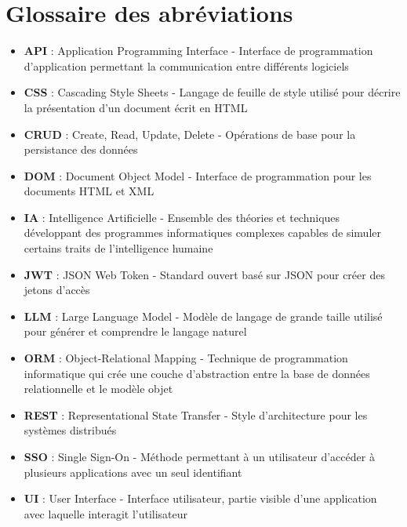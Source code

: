 \section{Glossaire des abréviations}

\begin{itemize}
  \item \textbf{API} : Application Programming Interface - Interface de programmation d'application permettant la communication entre différents logiciels
  
  \item \textbf{CSS} : Cascading Style Sheets - Langage de feuille de style utilisé pour décrire la présentation d'un document écrit en HTML
  
  \item \textbf{CRUD} : Create, Read, Update, Delete - Opérations de base pour la persistance des données
  
  \item \textbf{DOM} : Document Object Model - Interface de programmation pour les documents HTML et XML
  
  \item \textbf{IA} : Intelligence Artificielle - Ensemble des théories et techniques développant des programmes informatiques complexes capables de simuler certains traits de l'intelligence humaine
  
  \item \textbf{JWT} : JSON Web Token - Standard ouvert basé sur JSON pour créer des jetons d'accès
  
  \item \textbf{LLM} : Large Language Model - Modèle de langage de grande taille utilisé pour générer et comprendre le langage naturel
  
  \item \textbf{ORM} : Object-Relational Mapping - Technique de programmation informatique qui crée une couche d'abstraction entre la base de données relationnelle et le modèle objet
  
  \item \textbf{REST} : Representational State Transfer - Style d'architecture pour les systèmes distribués
  
  \item \textbf{SSO} : Single Sign-On - Méthode permettant à un utilisateur d'accéder à plusieurs applications avec un seul identifiant
  
  \item \textbf{UI} : User Interface - Interface utilisateur, partie visible d'une application avec laquelle interagit l'utilisateur
  

\end{itemize}
